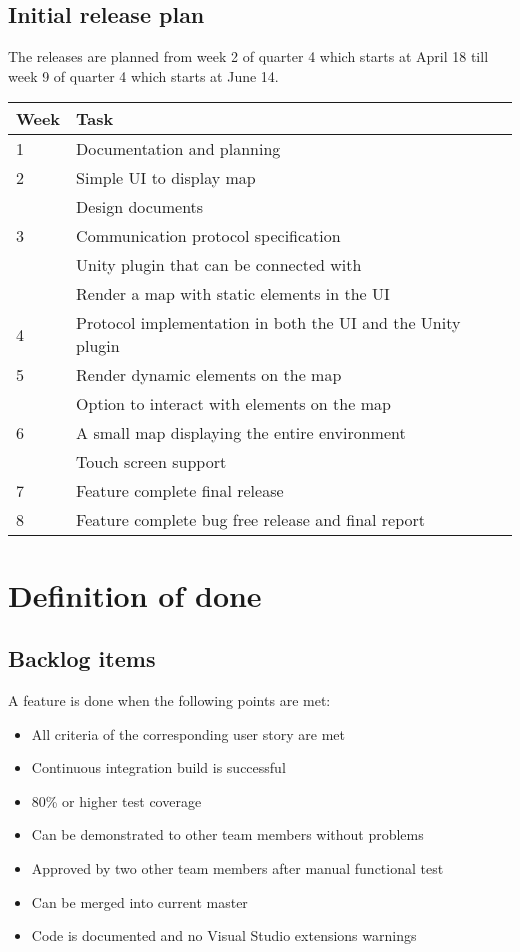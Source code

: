\documentclass[11pt]{article}
\begin{document}
    \subsection{Initial release plan}
    The releases are planned from week 2 of quarter 4 which starts at April 18 till week 9 of quarter 4 which starts at June 14.\\[\baselineskip]
    \begin{tabular}{ l l }
		Week & Task \\
        \hline
        1 & Documentation and planning \\
        2 & Simple UI to display map \\
          & Design documents \\
        3 & Communication protocol specification \\
          & Unity plugin that can be connected with \\
          & Render a map with static elements in the UI \\
        4 & Protocol implementation in both the UI and the Unity plugin \\
        5 & Render dynamic elements on the map \\
          & Option to interact with elements on the map \\
        6 & A small map displaying the entire environment \\
          & Touch screen support \\
        7 & Feature complete final release \\
        8 & Feature complete bug free release and final report \\
	\end{tabular}

\section{Definition of done}

	\subsection{Backlog items}
	A feature is done when the following points are met:
	\begin{itemize}
		\item All criteria of the corresponding user story are met
		\item Continuous integration build is successful
		\item 80\% or higher test coverage
	    \item Can be demonstrated to other team members without problems
		\item Approved by two other team members after manual functional test
	    \item Can be merged into current master
	    \item Code is documented and no Visual Studio extensions warnings
	\end{itemize}
\end{document}
